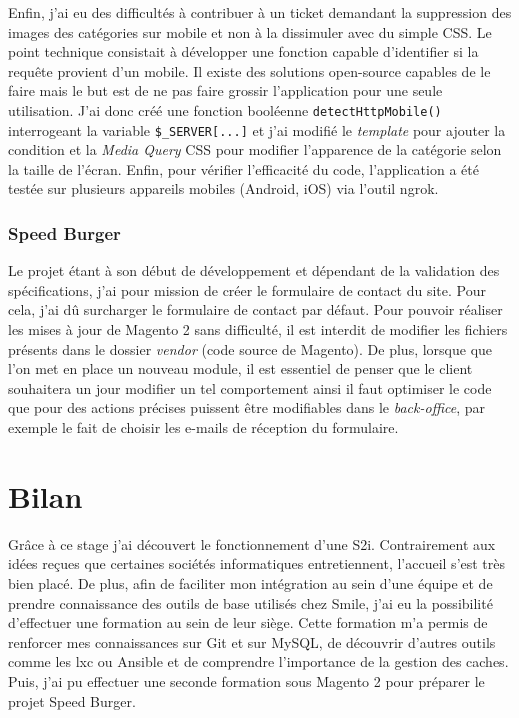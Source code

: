 \documentclass[12pt, a4paper, twoside]{report}
\begin{document}
Enfin, j'ai eu des difficultés à contribuer à un ticket demandant la suppression des images des catégories sur mobile et non à la dissimuler avec du simple CSS. Le point technique consistait à développer une fonction capable d'identifier si la requête provient d'un mobile. Il existe des solutions open-source capables de le faire mais le but est de ne pas faire grossir l'application pour une seule utilisation. J'ai donc créé une fonction booléenne \texttt{detectHttpMobile()} interrogeant la variable \texttt{\$\_SERVER[...]} et j'ai modifié le \textit{template} pour ajouter la condition et la \textit{Media Query} CSS pour modifier l'apparence de la catégorie selon la taille de l'écran. Enfin, pour vérifier l'efficacité du code, l'application a été testée sur plusieurs appareils mobiles (Android, iOS) via l'outil ngrok.

\subsection{Speed Burger}

Le projet étant à son début de développement et dépendant de la validation des spécifications, j'ai pour mission de créer le formulaire de contact du site. Pour cela, j'ai dû surcharger le formulaire de contact par défaut. Pour pouvoir réaliser les mises à jour de Magento 2 sans difficulté, il est interdit de modifier les fichiers présents dans le dossier \textit{vendor} (code source de Magento). De plus, lorsque que l'on met en place un nouveau module, il est essentiel de penser que le client souhaitera un jour modifier un tel comportement ainsi il faut optimiser le code que pour des actions précises puissent être modifiables dans le \textit{back-office}, par exemple le fait de choisir les e-mails de réception du formulaire. \\

\chapter{Bilan}

Grâce à ce stage j'ai découvert le fonctionnement d'une S2i. Contrairement aux idées reçues que certaines sociétés informatiques entretiennent, l'accueil s'est très bien placé. De plus, afin de faciliter mon intégration au sein d'une équipe et de prendre connaissance des outils de base utilisés chez Smile, j'ai eu la possibilité d'effectuer une formation au sein de leur siège. Cette formation m'a permis de renforcer mes connaissances sur Git et sur MySQL, de découvrir d'autres outils comme les lxc ou Ansible et de comprendre l'importance de la gestion des caches. Puis, j'ai pu effectuer une seconde formation sous Magento 2 pour préparer le projet Speed Burger. \\
\end{document}
